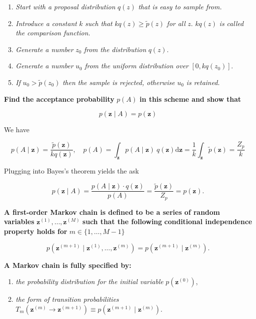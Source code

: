 \documentclass[11pt]{article}
\begin{document}
\begin{enumerate}
\item \emph{Start with a proposal distribution} \(q(z)\) \emph{that is easy to sample from.}
\item \emph{Introduce a constant} \(k\) \emph{such that} \(k q(z) \geqslant \widetilde{p}(z)\) \emph{for all} \(z\).  \(k q(z)\) \emph{is called the comparison function.}
\item \emph{Generate a number} \(z_0\) \emph{from the distribution} \(q(z)\).
\item \emph{Generate a number} \(u_0\) \emph{from the uniform distribution over} \(\left[0, k q\left(z_0\right)\right]\).
\item \emph{If} \(u_0>\widetilde{p}\left(z_0\right)\) \emph{then the sample is rejected, otherwise \(u_0\) is retained.}
\end{enumerate}

\textbf{Find the acceptance probability} \(p(A)\) \textbf{in this scheme and show that}

\[
p(\mathbf{z} \mid A) = p(\mathbf{z})
\]

We have

\[
p (A \mid \mathbf{z}) = \frac{\tilde{p}(\mathbf{z})}{k q (\mathbf{z})}, \quad p (A) = \int_{\mathbf{z}} p(A \mid \mathbf{z}) ~ q(\mathbf{z}) \mathrm{d} \mathbf{z} = \frac{1}{k} \int_{\mathbf{z}} \tilde{p} (\mathbf{z}) = \frac{Z_{p}}{k}
\]

Plugging into Bayes's theorem yields the ask

\[
p(\mathbf{z} \mid A) = \frac{p(A \mid \mathbf{z}) \cdot q(\mathbf{z})}{p(A)} = \frac{\tilde{p}(\mathbf{z})}{Z_{p}} = p(\mathbf{z}).
\]
\label{sec:org706a760}

\textbf{A first-order Markov chain is defined to be a series of random variables} \(\mathbf{z}^{(1)}, \ldots, \mathbf{z}^{(M)}\) \textbf{such that the following} \textbf{conditional independence property holds for} \(m \in\{1, \ldots, M-1\}\)

\[
p(\mathbf{z}^{(m+1)} \mid \mathbf{z}^{(1)}, \ldots, \mathbf{z}^{(m)})=p(\mathbf{z}^{(m+1)} \mid \mathbf{z}^{(m)}).
\]

\textbf{A Markov chain is fully specified by:}

\begin{enumerate}
\item \emph{the probability distribution for the initial variable} \(p(\mathbf{z}^{(0)})\),
\item \emph{the form of transition probabilities} \(T_m (\mathbf{z}^{(m)} \to \mathbf{z}^{(m+1)}) \equiv p (\mathbf{z}^{(m+1)} \mid \mathbf{z}^{(m)})\).
\end{enumerate}
\end{document}
